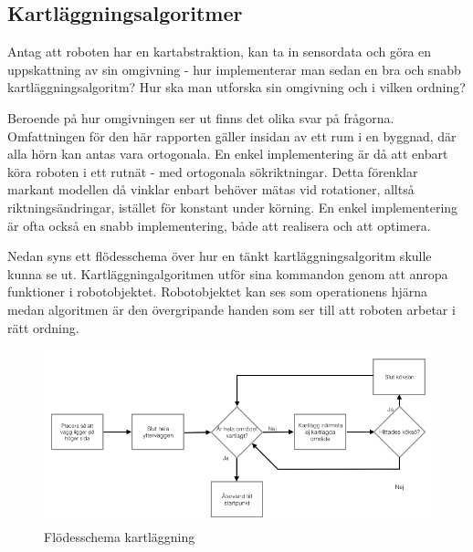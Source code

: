 \documentclass[a4paper,12pt,fleqn]{article}
\begin{document}

\newpage
\subsection{Kartläggningsalgoritmer}

Antag att roboten har en kartabstraktion, kan ta in sensordata och göra en uppskattning av sin omgivning - hur implementerar man sedan en bra och snabb kartläggningsalgoritm? Hur ska man utforska sin omgivning och i vilken ordning? 

Beroende på hur omgivningen ser ut finns det olika svar på frågorna. Omfattningen för den här rapporten gäller insidan av ett rum i en byggnad, där alla hörn kan antas vara ortogonala. En enkel implementering är då att enbart köra roboten i ett rutnät - med ortogonala sökriktningar. Detta förenklar markant modellen då vinklar enbart behöver mätas vid rotationer, alltså riktningsändringar, istället för konstant under körning. En enkel implementering är ofta också en snabb implementering, både att realisera och att optimera. 

Nedan syns ett flödesschema över hur en tänkt kartläggningsalgoritm skulle kunna se ut. Kartläggningalgoritmen utför sina kommandon genom att anropa funktioner i robotobjektet. Robotobjektet kan ses som operationens hjärna medan algoritmen är den övergripande handen som ser till att roboten arbetar i rätt ordning. 

\begin{figure}[htp] %
  \begin{center}
  \includegraphics[keepaspectratio=true,scale=0.5]{../../Designspec/Flode_kartritning.jpg}  %
  \end{center}
  \caption{Flödesschema kartläggning} %
  \label{fig:fire} %
\end{figure}
\end{document}
